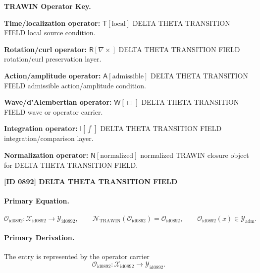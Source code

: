 \par\vspace{0.45\baselineskip}
\noindent\begin{minipage}[t]{\linewidth}
\begingroup
\small
\raggedright
\textbf{TRAWIN Operator Key.}\par
\noindent\textbf{Time/localization operator:} $\mathsf{T}\!\left[\mathrm{local}\right]$ DELTA THETA TRANSITION FIELD local source condition.\par
\noindent\textbf{Rotation/curl operator:} $\mathsf{R}\!\left[\nabla\times\right]$ DELTA THETA TRANSITION FIELD rotation/curl preservation layer.\par
\noindent\textbf{Action/amplitude operator:} $\mathsf{A}\!\left[\mathrm{admissible}\right]$ DELTA THETA TRANSITION FIELD admissible action/amplitude condition.\par
\noindent\textbf{Wave/d'Alembertian operator:} $\mathsf{W}\!\left[\Box\right]$ DELTA THETA TRANSITION FIELD wave or operator carrier.\par
\noindent\textbf{Integration operator:} $\mathsf{I}\!\left[\int\right]$ DELTA THETA TRANSITION FIELD integration/comparison layer.\par
\noindent\textbf{Normalization operator:} $\mathsf{N}\!\left[\mathrm{normalized}\right]$ normalized TRAWIN closure object for DELTA THETA TRANSITION FIELD.\par
\endgroup
\end{minipage}

\clearpage
\noindent\textbf{[ID 0892] DELTA THETA TRANSITION FIELD}\par
\vspace{0.35em}
\paragraph{Primary Equation.}
\[
\mathcal{O}_{\mathrm{id0892}}:\mathcal{X}_{\mathrm{id0892}}\longrightarrow \mathcal{Y}_{\mathrm{id0892}},\qquad
\mathcal{N}_{\mathrm{TRAWIN}}(\mathcal{O}_{\mathrm{id0892}})=\mathcal{O}_{\mathrm{id0892}},\qquad
\mathcal{O}_{\mathrm{id0892}}(x)\in\mathcal{Y}_{\mathrm{adm}}.
\]

\paragraph{Primary Derivation.} The entry is represented by the operator carrier\[
\mathcal{O}_{\mathrm{id0892}}:\mathcal{X}_{\mathrm{id0892}}\longrightarrow \mathcal{Y}_{\mathrm{id0892}}.
\]

